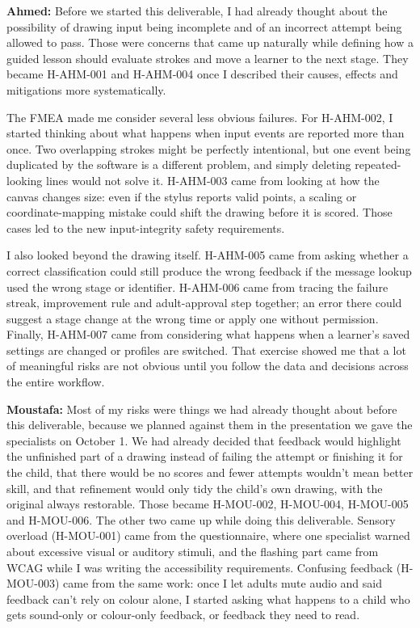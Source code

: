 \documentclass{article}
\begin{document}
\begin{enumerate}
\textbf{Ahmed:} Before we started this deliverable, I had already thought about
the possibility of drawing input being incomplete and of an incorrect attempt
being allowed to pass. Those were concerns that came up naturally while defining
how a guided lesson should evaluate strokes and move a learner to the next
stage. They became H-AHM-001 and H-AHM-004 once I described their causes,
effects and mitigations more systematically.

The FMEA made me consider several less obvious failures. For H-AHM-002, I
started thinking about what happens when input events are reported more than
once. Two overlapping strokes might be perfectly intentional, but one event
being duplicated by the software is a different problem, and simply deleting
repeated-looking lines would not solve it. H-AHM-003 came from looking at how
the canvas changes size: even if the stylus reports valid points, a scaling or
coordinate-mapping mistake could shift the drawing before it is scored. Those
cases led to the new input-integrity safety requirements.

I also looked beyond the drawing itself. H-AHM-005 came from asking whether a
correct classification could still produce the wrong feedback if the message
lookup used the wrong stage or identifier. H-AHM-006 came from tracing the
failure streak, improvement rule and adult-approval step together; an error
there could suggest a stage change at the wrong time or apply one without
permission. Finally, H-AHM-007 came from considering what happens when a
learner's saved settings are changed or profiles are switched. That exercise
showed me that a lot of meaningful risks are not obvious until you follow the
data and decisions across the entire workflow.

\textbf{Moustafa:} Most of my risks were things we had already thought about
before this deliverable, because we planned against them in the presentation we
gave the specialists on October 1. We had already decided that feedback would
highlight the unfinished part of a drawing instead of failing the attempt or
finishing it for the child, that there would be no scores and fewer attempts
wouldn't mean better skill, and that refinement would only tidy the child's own
drawing, with the original always restorable. Those became H-MOU-002, H-MOU-004,
H-MOU-005 and H-MOU-006. The other two came up while doing this deliverable.
Sensory overload (H-MOU-001) came from the questionnaire, where one specialist
warned about excessive visual or auditory stimuli, and the flashing part came
from WCAG while I was writing the accessibility requirements. Confusing feedback
(H-MOU-003) came from the same work: once I let adults mute audio and said
feedback can't rely on colour alone, I started asking what happens to a child
who gets sound-only or colour-only feedback, or feedback they need to read.


\end{enumerate}
\end{document}
